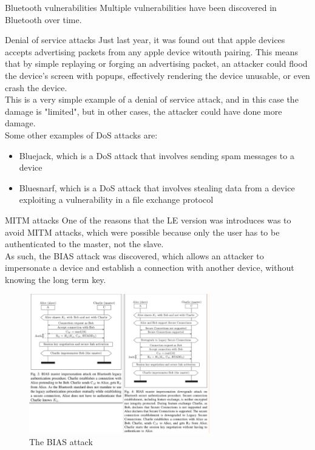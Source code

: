 \begin{section}{Bluetooth vulnerabilities}
  Multiple vulnerabilities have been discovered in Bluetooth over time.
  \begin{subsection}{Denial of service attacks}
    Just last year, it was found out that apple devices accepts advertising packets from any apple
    device witouth pairing. This means that by simple replaying or forging an advertising packet, an
    attacker could flood the device's screen with popups, effectively rendering the device unusable,
    or even crash the device.\\
    This is a very simple example of a denial of service attack, and in this case the damage is
    "limited", but in other cases, the attacker could have done more damage.\\
    Some other examples of DoS attacks are:
    \begin{itemize}
      \item Bluejack, which is a DoS attack that involves sending spam messages to a device
      \item Bluesnarf, which is a DoS attack that involves stealing data from a device exploiting a
        vulnerability in a file exchange protocol
    \end{itemize}
  \end{subsection}
  \begin{subsection}{MITM attacks}
    One of the reasons that the LE version was introduces was to avoid MITM attacks, which were
    possible because only the user has to be authenticated to the master, not the slave.\\
    As such, the BIAS attack was discovered, which allows an attacker to impersonate a device and
    establish a connection with another device, without knowing the long term key.\\
    \begin{figure}[H]
      \centering
      \includegraphics[width=0.7\textwidth]{img/wireless/bias attack.png}
      \caption{The BIAS attack}
    \end{figure}


  \end{subsection}

\end{section}
